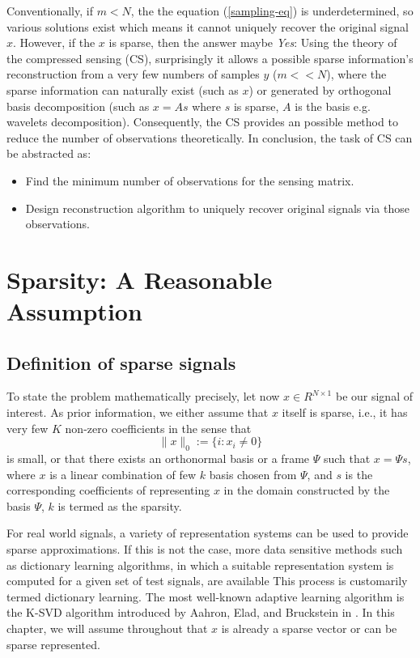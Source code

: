 Conventionally, if $m < N$, the the equation (\ref{sampling-eq}) is underdetermined, so various solutions exist which means it cannot uniquely recover the original signal $x$. However, if the $x$ is sparse, then the answer maybe \emph{Yes}: Using the theory of the compressed sensing (CS), surprisingly it allows a possible sparse information's reconstruction from a very few numbers of samples $y$ ($m << N$), where the sparse information can naturally exist (such as $x$) or generated by orthogonal basis decomposition (such as $x = As$ where $s$ is sparse, $A$ is the basis e.g. wavelets decomposition). Consequently, the CS provides an possible method to reduce the number of observations theoretically. In conclusion, the task of CS can be abstracted as:
\begin{itemize}
\item Find the minimum number of observations for the sensing matrix.
\item Design reconstruction algorithm to uniquely recover original signals via those observations.
\end{itemize}

\section{Sparsity: A Reasonable Assumption}

\subsection{Definition of sparse signals}

To state the problem mathematically precisely, let now $x \in R^{N \times 1}$ be our signal of interest. As prior information, we either assume that $x$ itself is sparse, i.e., it has very few $K$ non-zero coefficients in the sense that
\begin{equation}
\label{sparse_eq}
\| x \|_0 := \{i: x_i \neq 0\}
\end{equation}
is small, or that there exists an orthonormal basis or a frame $\Psi$ such that $x = \Psi s$, where $x$ is a linear combination of few $k$ basis chosen from $\Psi$, and $s$ is the corresponding coefficients of representing $x$ in the domain constructed by the basis $\Psi$, $k$ is termed as the sparsity.

For real world signals, a variety of representation systems can be used to provide sparse approximations. If this is not the case, more data sensitive methods such as dictionary learning algorithms, in which a suitable representation system is computed for a given set of test signals, are available This process is customarily termed dictionary learning. The most well-known adaptive learning algorithm is the K-SVD algorithm introduced by Aahron, Elad, and Bruckstein in \cite{aharon2006img}. In this chapter, we will assume throughout that $x$ is already a sparse vector or can be sparse represented.

